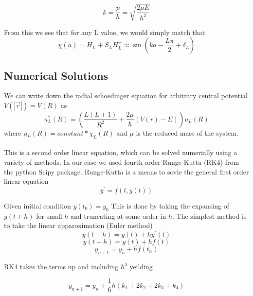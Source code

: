 \documentclass[11pt]{article} %
\begin{document}
\begin{equation}
k=\frac{p}{h}=\sqrt{\frac{2\mu E}{\hbar^2}}
\end{equation}

From this we see that for any L value, we would simply match that\\

\begin{equation}
\chi(a)=H_L^-+S_LH_L^+\approx \sin(ka-\frac{L\pi}{2}+\delta_L)
\end{equation}
\subsection{Numerical Solutions}

We can write down the radial schoedinger equation for arbitrary central potential $V(|\vec{r}|)=V(R)$ as \\
\begin{equation}
u_{L}^{''}(R)=\left(\frac{L(L+1)}{R^2}+\frac{2\mu}{\hbar}(V(r)-E)\right)u_{L}(R)
\end{equation}
where $u_{L}(R)=constant*\chi_{L}(R)$ and $\mu$ is the reduced mass of the system. \\ \\
This is a second order linear equation, which can be solved numerially using a variety of methods.  In our case we used fourth order
Runge-Kutta (RK4) from the python Scipy package.  Runge-Kutta is a means to sovle the general first order linear equation
\begin{equation}
y^{'}=f(t,y(t))
\end{equation}

Given initial condition $y(t_{0})=y_{0}$  This is done by taking the expansing of $y(t+h)$ for small $h$ and truncating at some order in $h$.  The simplest method is 
to take the linear apparoximation (Euler method) 
\begin{equation}
y(t+h)=y(t)+hy^{'}(t)
\end{equation}
\begin{equation}
y(t+h)=y(t)+hf(t)
\end{equation}
\begin{equation}
y_{n+1}=y_{n}+hf(t_{n})
\end{equation}

RK4 takes the terms up and including $h^4$ yeilding

\begin{equation}
y_{n+1}=y_{n}+\frac{1}{6}h(k_1 +2k_2 +2k_3 +k_4)
\end{equation}
\end{document}
